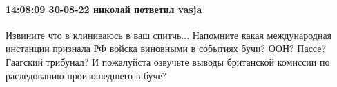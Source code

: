  
 
 
 
 

\paragraph{14:08:09 30-08-22 николай пответил vasja}

Извините что в клиниваюсь в ваш спитчь... Напомните какая международная
инстанции признала РФ войска виновными в событиях бучи? ООН? Пассе? Гаагский
трибунал? И пожалуйста озвучьте выводы британской комиссии по раследованию
произошедшего в буче?
